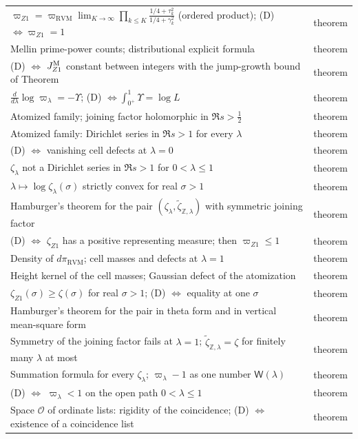 \documentclass[11pt,reqno]{amsart}
\makeatletter
\let\CG@origref\ref
\newcommand{\CG@gettip}[1]{\@ifundefined{CGTip@#1}{Reference: #1}{\csname CGTip@#1\endcsname}}
\DeclareRobustCommand{\CGref}[1]{\pdftooltip{\CG@origref{#1}}{\CG@gettip{#1}}}
\numberwithin{equation}{section}
\theoremstyle{plain}
\theoremstyle{definition}
\theoremstyle{remark}
\newcommand{\Z}{\mathbb Z}
\newcommand{\RVM}{\mathrm{RVM}}
\makeatother
\begin{document}
\begin{longtable}{p{}p{}}
$\varpi_{Z1}=\varpi_{\RVM}\lim_{K\to\infty}\prod_{k\le K}\frac{1/4+\tau_k^2}{1/4+\gamma_k^2}$ (ordered product); (D) $\Leftrightarrow\varpi_{Z1}=1$ & theorem\\
Mellin prime-power counts; distributional explicit formula & theorem\\
(D) $\Leftrightarrow$ $J_{Z1}^{\rm M}$ constant between integers with the jump-growth bound of Theorem~\CGref{thm:cell-form} & theorem\\
$\frac d{d\lambda}\log\varpi_\lambda=-\Upsilon$; (D) $\Leftrightarrow\int_{0^+}^1\Upsilon=\log L$ & theorem\\
Atomized family; joining factor holomorphic in $\Re s>\frac12$ & theorem\\
Atomized family: Dirichlet series in $\Re s>1$ for every $\lambda$ & theorem\\
(D) $\Leftrightarrow$ vanishing cell defects at $\lambda=0$ & theorem\\
$\zeta_\lambda$ not a Dirichlet series in $\Re s>1$ for $0<\lambda\le1$ & theorem\\
$\lambda\mapsto\log\zeta_\lambda(\sigma)$ strictly convex for real $\sigma>1$ & theorem\\
Hamburger's theorem for the pair $(\zeta_\lambda,\tilde\zeta_{\Z,\lambda})$ with symmetric joining factor & theorem\\
(D) $\Leftrightarrow$ $\zeta_{Z1}$ has a positive representing measure; then $\varpi_{Z1}\le1$ & theorem\\
Density of $d\pi_{\RVM}$; cell masses and defects at $\lambda=1$ & theorem\\
Height kernel of the cell masses; Gaussian defect of the atomization & theorem\\
$\zeta_{Z1}(\sigma)\ge\zeta(\sigma)$ for real $\sigma>1$; (D) $\Leftrightarrow$ equality at one $\sigma$ & theorem\\
Hamburger's theorem for the pair in theta form and in vertical mean-square form & theorem\\
Symmetry of the joining factor fails at $\lambda=1$; $\tilde\zeta_{\Z,\lambda}=\zeta$ for finitely many $\lambda$ at most & theorem\\
Summation formula for every $\zeta_\lambda$; $\varpi_\lambda-1$ as one number $\mathsf W(\lambda)$ & theorem\\
(D) $\Leftrightarrow$ $\varpi_\lambda<1$ on the open path $0<\lambda\le1$ & theorem\\
Space $\mathscr O$ of ordinate lists: rigidity of the coincidence; (D) $\Leftrightarrow$ existence of a coincidence list & theorem\\

\end{longtable}
\end{document}
